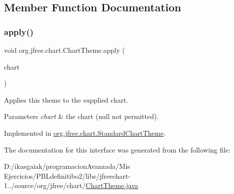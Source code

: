 \subsection{Member Function Documentation}
\mbox{\label{interfaceorg_1_1jfree_1_1chart_1_1_chart_theme_a7e7055b6ed699dbd041616193a410bd6}} 
\subsubsection{\texorpdfstring{apply()}{apply()}}
{\footnotesize\ttfamily void org.\+jfree.\+chart.\+Chart\+Theme.\+apply (\begin{DoxyParamCaption}\item[{\mbox{\hyperlink{classorg_1_1jfree_1_1chart_1_1_j_free_chart}{J\+Free\+Chart}}}]{chart }\end{DoxyParamCaption})}

Applies this theme to the supplied chart.


\begin{DoxyParams}{Parameters}
{\em chart} & the chart ({\ttfamily null} not permitted). \\
\hline
\end{DoxyParams}


Implemented in \mbox{\hyperlink{classorg_1_1jfree_1_1chart_1_1_standard_chart_theme_a70be2e38a735bc70a8da19ba525ab536}{org.\+jfree.\+chart.\+Standard\+Chart\+Theme}}.



The documentation for this interface was generated from the following file\+:\begin{DoxyCompactItemize}
\item 
D\+:/ikasgaiak/programacion\+Avanzada/\+Mis Ejercicios/\+P\+B\+Ldefinitibo2/libs/jfreechart-\/1../source/org/jfree/chart/\mbox{\hyperlink{_chart_theme_8java}{Chart\+Theme.\+java}}\end{DoxyCompactItemize}
